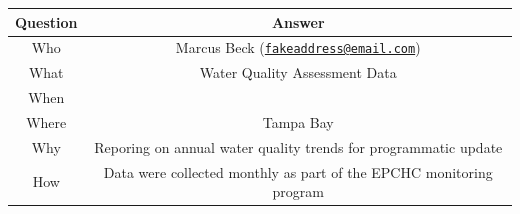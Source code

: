 \documentclass[
]{book}
\begin{document}
\begin{longtable}[]{@{}cc@{}}
\toprule
\begin{minipage}[b]{0.14\columnwidth}\centering
Question\strut
\end{minipage} & \begin{minipage}[b]{0.43\columnwidth}\centering
Answer\strut
\end{minipage}\tabularnewline
\midrule
\endhead
\begin{minipage}[t]{0.14\columnwidth}\centering
Who\strut
\end{minipage} & \begin{minipage}[t]{0.43\columnwidth}\centering
Marcus Beck
(\href{mailto:fakeaddress@email.com}{\nolinkurl{fakeaddress@email.com}})\strut
\end{minipage}\tabularnewline
\begin{minipage}[t]{0.14\columnwidth}\centering
What\strut
\end{minipage} & \begin{minipage}[t]{0.43\columnwidth}\centering
Water Quality Assessment Data\strut
\end{minipage}\tabularnewline
\begin{minipage}[t]{0.14\columnwidth}\centering
When\strut
\end{minipage} & \begin{minipage}[t]{0.43\columnwidth}\centering
2020\strut
\end{minipage}\tabularnewline
\begin{minipage}[t]{0.14\columnwidth}\centering
Where\strut
\end{minipage} & \begin{minipage}[t]{0.43\columnwidth}\centering
Tampa Bay\strut
\end{minipage}\tabularnewline
\begin{minipage}[t]{0.14\columnwidth}\centering
Why\strut
\end{minipage} & \begin{minipage}[t]{0.43\columnwidth}\centering
Reporing on annual water
quality trends for
programmatic update\strut
\end{minipage}\tabularnewline
\begin{minipage}[t]{0.14\columnwidth}\centering
How\strut
\end{minipage} & \begin{minipage}[t]{0.43\columnwidth}\centering
Data were collected monthly as
part of the EPCHC monitoring
program\strut
\end{minipage}\tabularnewline
\bottomrule
\end{longtable}
\end{document}
